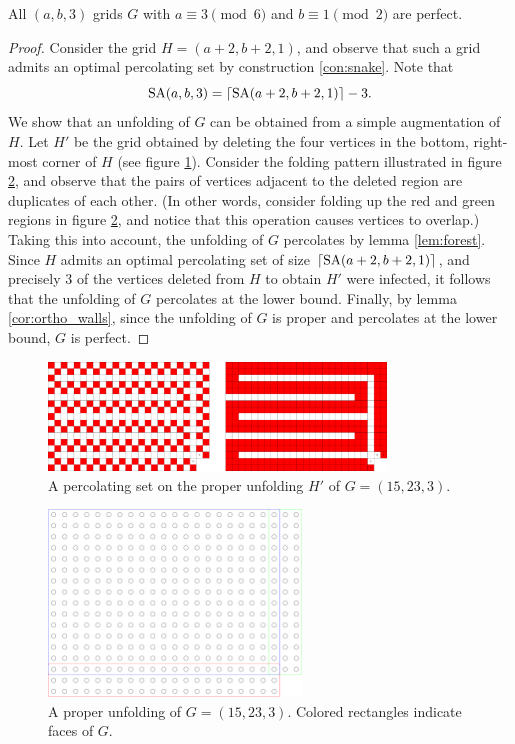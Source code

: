 \begin{con}
All $(a,b,3)$ grids $G$ with $a \equiv 3 \pmod 6$ and $b \equiv 1 \pmod 2$ are perfect. 
\end{con}

\begin{proof}
Consider the grid $H=(a+2,b+2,1)$, and observe that such a grid admits an optimal percolating set by construction \ref{con:snake}. Note that
$$\text{SA}(a,b,3) = \lceil\text{SA}(a+2,b+2,1)\rceil - 3.$$
We show that an unfolding of $G$ can be obtained from a simple augmentation of $H$. Let $H'$ be the grid obtained by deleting the four vertices in the bottom, right-most corner of $H$ (see figure \ref{fig:17x25x1_unfolded}). Consider the folding pattern illustrated in figure \ref{fig:17x25x1_manifold}, and observe that the pairs of vertices adjacent to the deleted region are duplicates of each other. (In other words, consider folding up the red and green regions in figure \ref{fig:17x25x1_manifold}, and notice that this operation causes vertices to overlap.) Taking this into account, the unfolding of $G$ percolates by lemma \ref{lem:forest}. Since $H$ admits an optimal percolating set of size $\lceil\text{SA}(a+2,b+2,1)\rceil$, and precisely 3 of the vertices deleted from $H$ to obtain $H'$ were infected, it follows that the unfolding of $G$ percolates at the lower bound. Finally, by lemma \ref{cor:ortho_walls}, since the unfolding of $G$ is proper and percolates at the lower bound, $G$ is perfect.
\end{proof}

\begin{figure}[]
\centering
\includegraphics[width=0.8\textwidth]{figures/4/17x25x1_unfolded.pdf}
\caption{A percolating set on the proper unfolding $H'$ of $G= (15,23,3)$.}
\label{fig:17x25x1_unfolded}
\end{figure}

\begin{figure}[]
\centering
\includegraphics[width=0.6\textwidth]{figures/4/17x25x1_manifold.pdf}
\caption{A proper unfolding of $G= (15,23,3)$. Colored rectangles indicate faces of $G$. }
\label{fig:17x25x1_manifold}
\end{figure}

